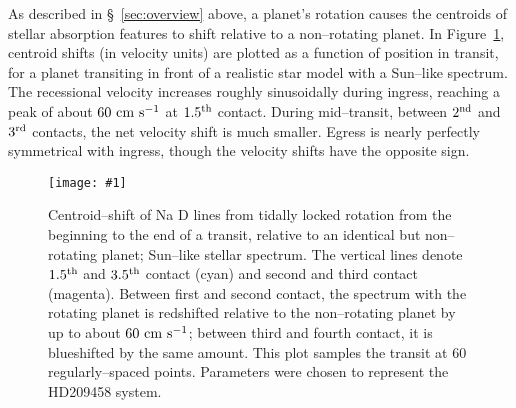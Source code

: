 \documentclass[12pt,preprint]{aastex}
\def\plotone#1{\centering \leavevmode
\texttt{[image: \#1]}}
\begin{document}
As described in \S~\ref{sec:overview} above, a planet's rotation causes
the centroids of stellar absorption features to shift relative to a
non--rotating planet.  In Figure~\ref{fig:delta v}, centroid shifts
(in velocity units) are plotted as a function of position in transit, for
a planet transiting in front of a realistic star model with a Sun--like
spectrum. The recessional velocity increases roughly sinusoidally during
ingress, reaching a peak of about $60 {\rm ~cm~s^{-1}}$ at $1.5^{\rm th}$
contact.  During mid--transit, between $2^{\rm nd}$ and $3^{\rm rd}$
contacts, the net velocity shift is much smaller.  Egress is nearly
perfectly symmetrical with ingress, though the velocity shifts have the
opposite sign.
\begin{figure}[h!]
\plotone
{fig3.eps}
\caption{Centroid--shift of Na D lines from tidally locked rotation from the
beginning to the end of a transit, relative to an identical but non--rotating
planet; Sun--like stellar spectrum.
The vertical lines denote $1.5^{\rm th}$ and $3.5^{\rm th}$ contact (cyan)
and second and third contact (magenta).
Between first and second contact, the
spectrum with the rotating planet is redshifted relative to the non--rotating
planet by up to about $60 {\rm ~cm~s^{-1}}$; between third and fourth contact,
it is blueshifted by the same amount.  This plot samples the transit at 60
regularly--spaced points.  Parameters were chosen to represent the HD209458
system.}
\label{fig:delta v}
\end{figure}
\end{document}
